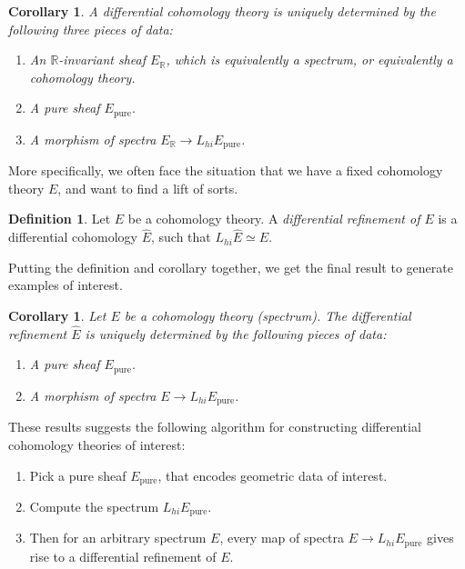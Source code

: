 \documentclass[10pt]{amsart}
\newcommand{\bR}{\mathbb{R}}
\newtheorem{corollary}[equation]{Corollary}
\theoremstyle{definition}
\newtheorem{definition}[equation]{Definition}
\theoremstyle{remark}
\numberwithin{equation}{section}
\begin{document}
\begin{corollary}
  A differential cohomology theory is uniquely determined by the following three pieces of data:
  \begin{enumerate}
    \item An $\bR$-invariant sheaf $E_{\bR}$, which is equivalently a spectrum, or equivalently a cohomology theory.
    \item A pure sheaf $E_{\mathrm{pure}}$. 
    \item A morphism of spectra $E_{\bR} \to L_{hi}E_{\mathrm{pure}}$.
  \end{enumerate}
\end{corollary}

More specifically, we often face the situation that we have a fixed cohomology theory $E$, and want to find a lift of sorts.

\begin{definition}
  Let $E$ be a cohomology theory. A \emph{differential refinement of $E$} is a differential cohomology $\hat{E}$, such that $L_{hi}\hat{E} \simeq E$.
\end{definition}

Putting the definition and corollary together, we get the final result to generate examples of interest.

\begin{corollary}
 Let $E$ be a cohomology theory (spectrum). The differential refinement $\hat{E}$ is uniquely determined by the following pieces of data:
\begin{enumerate}
  \item A pure sheaf $E_{\mathrm{pure}}$.
  \item A morphism of spectra $E \to L_{hi}E_{\mathrm{pure}}$.
\end{enumerate}
\end{corollary}

These results suggests the following algorithm for constructing differential cohomology theories of interest:
\begin{enumerate}
  \item Pick a pure sheaf $E_{\mathrm{pure}}$, that encodes geometric data of interest.
  \item Compute the spectrum $L_{hi}E_{\mathrm{pure}}$.
  \item Then for an arbitrary spectrum $E$, every map of spectra $E \to L_{hi}E_{\mathrm{pure}}$ gives rise to a differential refinement of $E$.
\end{enumerate}
\end{document}
